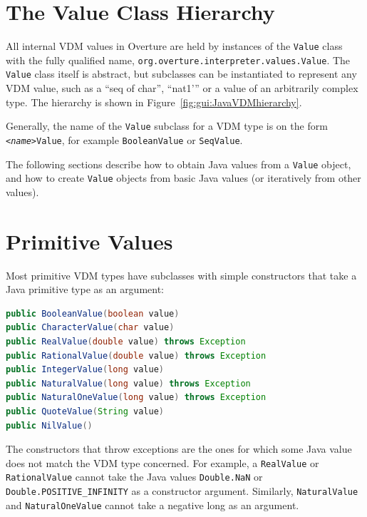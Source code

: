 \documentclass{overturerepchap}
\newcommand{\kw}[1]{{\textbf\ttfamily #1}}
\begin{document}
\section{The Value Class Hierarchy}

All internal VDM values in Overture are held by instances of the \texttt{Value}
class with the fully qualified name,
\texttt{org.overture.interpreter.values.Value}. The \texttt{Value} class itself
is abstract, but subclasses can be instantiated to represent any VDM value,
such as a ``\kw{seq of char}'', ``\kw{nat1}'” or a value of an arbitrarily
complex type. The hierarchy is shown in Figure~\ref{fig:gui:JavaVDMhierarchy}.

Generally, the name of the \texttt{Value} subclass for a VDM type is on the form \texttt{<\textit{name}>Value}, for example \texttt{BooleanValue} or \texttt{SeqValue}.
 
The following sections describe how to obtain Java values from a \texttt{Value} object, and how to create \texttt{Value} objects from basic Java values (or iteratively from other values).

\section{Primitive Values}

Most primitive VDM types have subclasses with simple constructors that take a Java primitive type as an argument:

\begin{lstlisting}[language=JAVA]
public BooleanValue(boolean value)
public CharacterValue(char value)
public RealValue(double value) throws Exception
public RationalValue(double value) throws Exception
public IntegerValue(long value)
public NaturalValue(long value) throws Exception
public NaturalOneValue(long value) throws Exception
public QuoteValue(String value)
public NilValue()
\end{lstlisting}

The constructors that throw exceptions are the ones for which some Java value does not match the VDM type concerned. For example, a \texttt{RealValue} or \texttt{RationalValue} cannot take the Java values \texttt{Double.NaN} or \texttt{Double.POSITIVE\_INFINITY} as a constructor argument. Similarly, \texttt{NaturalValue} and \texttt{NaturalOneValue} cannot take a negative long as an argument.
\end{document}
